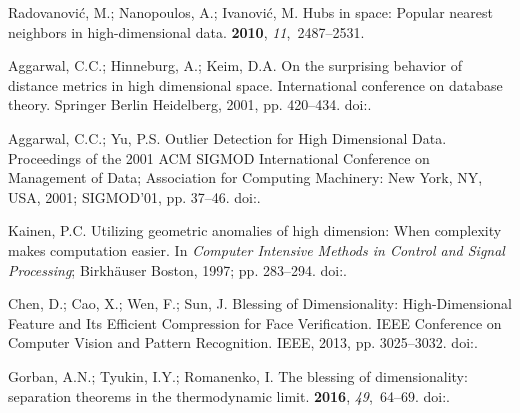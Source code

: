 \documentclass[entropy,article,submit,moreauthors,pdftex]{Definitions/mdpi}
\begin{document}
\begin{thebibliography}{-------}
Radovanovi{\'c}, M.; Nanopoulos, A.; Ivanovi{\'c}, M.
\newblock Hubs in space: Popular nearest neighbors in high-dimensional data.
 {\bf 2010}, {\em 11},~2487--2531.

Aggarwal, C.C.; Hinneburg, A.; Keim, D.A.
\newblock On the surprising behavior of distance metrics in high dimensional
  space.
\newblock  International conference on database theory. Springer Berlin
  Heidelberg,  2001, pp. 420--434.
\newblock
  doi:{\href{https://doi.org/10.1007/3-540-44503-x_27}{}}.

Aggarwal, C.C.; Yu, P.S.
\newblock Outlier Detection for High Dimensional Data.
\newblock  Proceedings of the 2001 ACM SIGMOD International Conference on
  Management of Data; Association for Computing Machinery: New York, NY, USA,
  2001; SIGMOD'01, pp. 37--46.
\newblock
  doi:{\href{https://doi.org/10.1145/375663.375668}{}}.

Kainen, P.C.
\newblock Utilizing geometric anomalies of high dimension: When complexity
  makes computation easier. In {\em Computer Intensive Methods in Control and
  Signal Processing}; Birkh\"{a}user Boston,  1997; pp. 283--294.
\newblock
  doi:{\href{https://doi.org/10.1007/978-1-4612-1996-5_18}{}}.

Chen, D.; Cao, X.; Wen, F.; Sun, J.
\newblock Blessing of Dimensionality: High-Dimensional Feature and Its
  Efficient Compression for Face Verification.
 IEEE Conference on Computer Vision and Pattern Recognition.
  {IEEE},  2013, pp. 3025--3032.
\newblock
  doi:{\href{https://doi.org/10.1109/CVPR.2013.389}{}}.

Gorban, A.N.; Tyukin, I.Y.; Romanenko, I.
\newblock The blessing of dimensionality: separation theorems in the
  thermodynamic limit.
 {\bf 2016}, {\em 49},~64--69.
\newblock
  doi:{\href{https://doi.org/10.1016/j.ifacol.2016.10.755}{}}.


\end{thebibliography}
\end{document}
